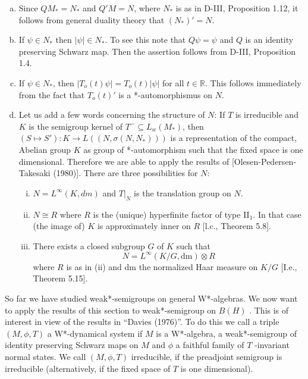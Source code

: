 \begin{remarks}\label{rem:d4-3.6}
\begin{enumerate}[(a)]
\item
Since $QM_{*} = N_{*}$ and $Q'M = N$, where $N_{*}$ is as in D-III, Proposition 1.12, it follows from general duality theory that $(N_{*})' = N$.

\item
If $\psi \in N_{*}$ then $|\psi| \in N_{*}$.
To see this note that $Q\psi = \psi$ and $Q$ is an identity preserving Schwarz map.
Then the assertion follows from D-III, Proposition 1.4.

\item
If $\psi \in N_{*}$, then $|T_{o}(t)\psi| = T_{o}(t)|\psi|$ for all $t \in \mathbb{R}$.
This follows immediately from the fact that $T_{o}(t)'$ is a *-automorphismus on $N$.

\item
Let us add a few words concerning the structure of $N$: If $T$ is irreducible and $K$ is the semigroup kernel of $T^{-} \subseteq L_{w}(M_{*})$, then $(S \mapsto S'): K \to L((N,\sigma(N,N_{*})))$ is a representation of the compact, Abelian group $K$ as group of *-automorphism such that the fixed space is one dimensional.
Therefore we are able to apply the results of [Olesen-Pedersen-Takesaki (1980)].
There are three possibilities for $N$:

\begin{enumerate}[(i)]
\item
$N = L^{\infty}(K,dm)$ and $T|_{N}$ is the translation group on $N$.

\item
$N \cong R$ where $R$ is the (unique) hyperfinite factor of type II$_{1}$.
In that case (the image of) $K$ is approximately inner on $R$ [l.c., Theorem 5.8].


\item
There exists a closed subgroup $ G $  of $ K $  such that
\[
N = L^{\infty}(K/G, \text{dm}) \otimes R
\]
where $ R $  is as in (ii) and $ \text{dm} $  the normalized Haar measure on $ K/G $  [I.e., Theorem 5.15].
\end{enumerate}
\end{enumerate}
\end{remarks}

\newpage
So far we have studied weak*-semigroups on general W*-algebras.
We now want to apply the results of this section to weak*-semigroup on $ B(H) $ .
This is of interest in view of the results in \enquote{Davies (1976)}.
To do this we call a triple $ (M,\phi,T) $  a W*-dynamical system if $ M $  is a W*-algebra, a weak*-semigroup of identity preserving Schwarz maps on $ M $  and $ \phi $  a faithful family of $ T $ -invariant normal states.
We call $ (M,\phi,T) $  irreducible, if the preadjoint semigroup is irreducible (alternatively, if the fixed space of $ T $  is one dimensional).

